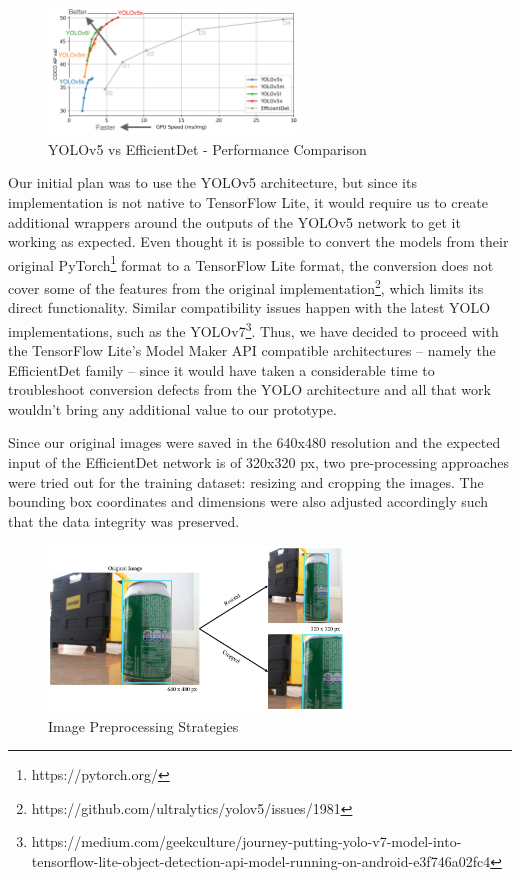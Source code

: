 \documentclass[openright]{normas-utf-tex} %
\begin{document}
\begin{figure}[H]
	\centering
	\includegraphics[width=0.6\textwidth]{./images/yolo-efficientdet-comparison.png}
	\caption[YOLOv5 vs EfficientDet - Performance Comparison]{YOLOv5 vs EfficientDet - Performance Comparison}
    \label{fig:diff}
\end{figure}

Our initial plan was to use the YOLOv5 architecture, but since its
implementation is not native to TensorFlow Lite, it would require us to create
additional wrappers around the outputs of the YOLOv5 network to get it working
as expected. Even thought it is possible to convert the models from their
original PyTorch\footnote{https://pytorch.org/} format to a TensorFlow Lite
format, the conversion does not cover some of the features from the original
implementation\footnote{https://github.com/ultralytics/yolov5/issues/1981},
which limits its direct functionality. Similar compatibility issues happen with
the latest YOLO implementations, such as the
YOLOv7\footnote{https://medium.com/geekculture/journey-putting-yolo-v7-model-into-tensorflow-lite-object-detection-api-model-running-on-android-e3f746a02fc4}.
Thus, we have decided to proceed with the TensorFlow Lite's Model Maker API
compatible architectures -- namely the EfficientDet family --  since it would
have taken a considerable time to troubleshoot conversion defects from the YOLO
architecture and all that work wouldn't bring any additional value to our
prototype.

Since our original images were saved in the 640x480 resolution and the expected
input of the EfficientDet network is of 320x320 px, two pre-processing
approaches were tried out for the training dataset: resizing and cropping the
images. The bounding box coordinates and dimensions were also adjusted
accordingly such that the data integrity was preserved. 

\begin{figure}[H]
	\centering
	\includegraphics[width=0.7\textwidth]{./images/image_preprocessing.png}
	\caption[Image Preprocessing Strategies]{Image Preprocessing Strategies}
\end{figure}
\end{document}
